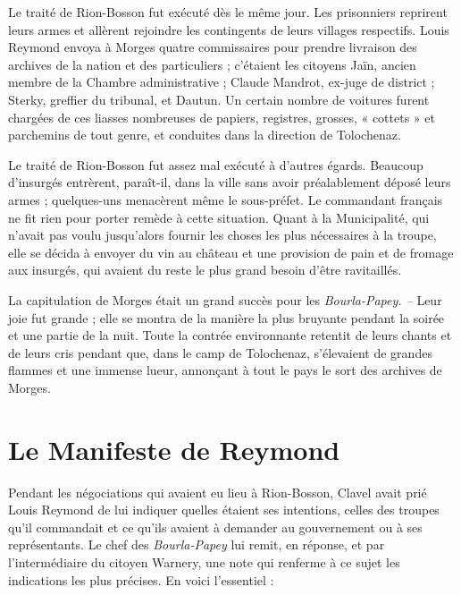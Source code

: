 \documentclass[french,twoside]{book} %
\begin{document}
Le traité de Rion-Bosson fut exécuté dès le même jour. Les prisonniers reprirent leurs armes et allèrent rejoindre les contingents de leurs villages respectifs. Louis Reymond envoya à Morges quatre commissaires pour prendre livraison des archives de la nation et des particuliers ; c’étaient les citoyens Jaïn, ancien membre de la Chambre administrative ; Claude Mandrot, ex-juge de district ; Sterky, greffier du tribunal, et Dautun. Un certain nombre de voitures furent chargées de ces liasses nombreuses de papiers, registres, grosses, « cottets » et parchemins de tout genre, et conduites dans la direction de Tolochenaz.\par
Le traité de Rion-Bosson fut assez mal exécuté à d’autres égards. Beaucoup d’insurgés entrèrent, paraît-il, dans la ville sans avoir préalablement déposé leurs armes ; quelques-uns menacèrent même le sous-préfet. Le commandant français ne fit rien pour porter remède à cette situation. Quant à la Municipalité, qui n’avait pas voulu jusqu’alors fournir les choses les plus nécessaires à la troupe, elle se décida à envoyer du vin au château et une provision de pain et de fromage aux insurgés, qui avaient du reste le plus grand besoin d’être ravitaillés.\par
La capitulation de Morges était un grand succès pour les \emph{Bourla-Papey. –} Leur joie fut grande ; elle se montra de la manière la plus bruyante pendant la soirée et une partie de la nuit. Toute la contrée environnante retentit de leurs chants et de leurs cris pendant que, dans le camp de Tolochenaz, s’élevaient de grandes flammes et une immense lueur, annonçant à tout le pays le sort des archives de Morges.
\section[Le Manifeste de Reymond]{Le Manifeste de Reymond}
\noindent Pendant les négociations qui avaient eu lieu à Rion-Bosson, Clavel avait prié Louis Reymond de lui indiquer quelles étaient ses intentions, celles des troupes qu’il commandait et ce qu’ils avaient à demander au gouvernement ou à ses représentants. Le chef des \emph{Bourla-Papey} lui remit, en réponse, et par l’intermédiaire du citoyen Warnery, une note qui renferme à ce sujet les indications les plus précises. En voici l’essentiel :\par
\end{document}
